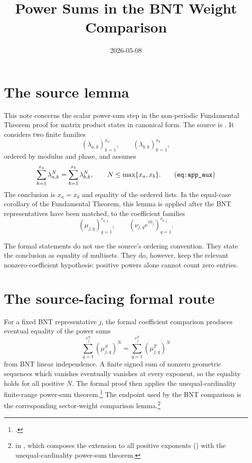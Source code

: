 \documentclass{article}
\title{Power Sums in the BNT Weight Comparison}
\author{}
\date{2026-05-08}
\begin{document}
\maketitle

\section{The source lemma}

This note concerns the scalar power-sum step in the non-periodic Fundamental
Theorem proof for matrix product states in canonical form. The source is
\cite[Lemma~\texttt{Lem:app\_simple}, lines~1155--1163]{Cirac2016MPDO_arXiv}.
It considers two finite families
\[
    (\lambda_{a,k})_{k=1}^{x_a},
    \qquad
    (\lambda_{b,k})_{k=1}^{x_b},
\]
ordered by modulus and phase, and assumes
\[
    \sum_{k=1}^{x_a}\lambda_{a,k}^{N}
    =
    \sum_{k=1}^{x_b}\lambda_{b,k}^{N},
    \qquad N\le \max\{x_a,x_b\}.      \tag{\texttt{eq:app\_aux}}
\]
The conclusion is $x_a=x_b$ and equality of the ordered lists. In the
equal-case corollary of the Fundamental Theorem, this lemma is applied after
the BNT representatives have been matched, to the coefficient families
\[
    (\mu_{j,q})_{q=1}^{r_{a,j}},
    \qquad
    (\nu_{j,q}e^{i\phi_j})_{q=1}^{r_{b,j}}.
\]

The formal statements do not use the source's ordering convention. They state
the conclusion as equality of multisets. They do, however, keep the relevant
nonzero-coefficient hypothesis: positive powers alone cannot count zero
entries.

\section{The source-facing formal route}

For a fixed BNT representative $j$, the formal coefficient comparison produces
eventual equality of the power sums
\[
    \sum_{q=1}^{r_j^S}(\mu^S_{j,q})^N
    =
    \sum_{q=1}^{r_j^T}(\mu^T_{j,q})^N
\]
from BNT linear independence. A finite signed sum of nonzero geometric
sequences which vanishes eventually vanishes at every exponent, so the equality
holds for all positive $N$. The formal proof then applies the
unequal-cardinality finite-range power-sum theorem.\footnote{.}
The endpoint used by the BNT comparison is the corresponding sector-weight
comparison lemma.\footnote{ in
    , which composes
    the extension to all positive exponents
    () with
    the unequal-cardinality power-sum theorem.}
\end{document}
